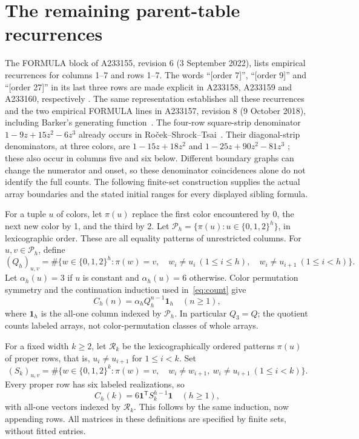 \documentclass[11pt,a4paper]{article}
\newcommand{\ones}{\boldsymbol{1}}
\newcommand{\counts}{C}
\begin{document}
\section{The remaining parent-table recurrences}\label{sec:siblings}
The FORMULA block of A233155, revision 6 (3 September 2022), lists
empirical recurrences for columns 1--7 and rows 1--7. The words
``[order 7]'', ``[order 9]'' and ``[order 27]'' in its last three rows
are made explicit in A233158, A233159 and A233160, respectively
\cite{higher}. The same representation establishes all these recurrences
and the two empirical FORMULA lines in A233157, revision 8
(9 October 2018), including Barker's generating function~\cite{four}.
The four-row square-strip denominator \(1-9z+15z^2-6z^3\)
already occurs in Ro\v{c}ek--Shrock--Tsai~\cite[eqs.~(3.4)--(3.6)]{rst}.
Their diagonal-strip denominators, at three colors, are
\(1-15z+18z^2\) and \(1-25z+90z^2-81z^3\)
\cite[Appendix~II.A, eqs.~(8.3)--(8.4), (8.8)--(8.10)]{rst}; these
also occur in columns five and six below. Different boundary graphs
can change the numerator and onset, so these denominator coincidences
alone do not identify the full counts. The following finite-set
construction supplies the actual array boundaries and the stated
initial ranges for every displayed sibling formula.

For a tuple \(u\) of colors, let \(\pi(u)\) replace the first color
encountered by 0, the next new color by 1, and the third by 2.
Let \(\mathcal P_h=\{\pi(u):u\in\{0,1,2\}^h\}\), in lexicographic
order. These are all equality patterns of unrestricted columns.
For \(u,v\in\mathcal P_h\), define
\[
 (Q_h)_{u,v}=\#\{w\in\{0,1,2\}^h:\pi(w)=v,\quad
 w_i\ne u_i\ (1\le i\le h),\quad
 w_i\ne u_{i+1}\ (1\le i<h)\}.
\]
Let \(\alpha_h(u)=3\) if \(u\) is constant and \(\alpha_h(u)=6\)
otherwise. Color permutation symmetry and the continuation induction
used in~\eqref{eq:count} give
\begin{equation}\label{eq:generic-row}
 \counts_h(n)=\alpha_h Q_h^{n-1}\ones_h\quad(n\ge1),
\end{equation}
where \(\ones_h\) is the all-one column indexed by \(\mathcal P_h\).
In particular \(Q_3=Q\); the quotient counts labeled arrays, not
color-permutation classes of whole arrays.

For a fixed width \(k\ge2\), let \(\mathcal R_k\) be the lexicographically
ordered patterns \(\pi(u)\) of proper rows, that is,
\(u_i\ne u_{i+1}\) for \(1\le i<k\). Set
\[
 (S_k)_{u,v}=\#\{w\in\{0,1,2\}^k:\pi(w)=v,\quad
 w_i\ne w_{i+1},\ w_i\ne u_{i+1}\ (1\le i<k)\}.
\]
Every proper row has six labeled realizations, so
\begin{equation}\label{eq:generic-column}
 \counts_h(k)=6\boldsymbol{1}^{\mathsf T}S_k^{h-1}\boldsymbol{1}
 \quad(h\ge1),
\end{equation}
with all-one vectors indexed by \(\mathcal R_k\).
This follows by the same induction, now appending rows. All matrices
in these definitions are specified by finite sets, without fitted entries.
\end{document}
